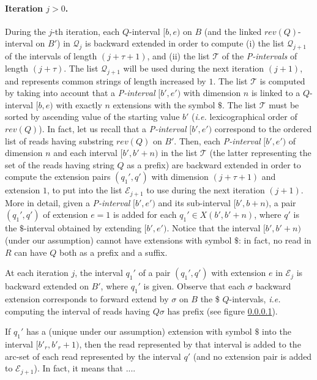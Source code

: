 \documentclass[runningheads,envcountsame,a4paper]{llncs}
\newcommand{\notaestesa}[2]{%
  {\sffamily {\bfseries #1}{\footnotesize #2}}%
  \marginpar{\framebox{\Large *}}%
}
\newcommand{\ie}{\textit{i.e.}\xspace}
\begin{document}
\paragraph{Iteration $j > 0$.}

During the $j$-th iteration, each $Q$-interval $[b, e)$ on $B$ (and the
linked $rev(Q)$-interval on $B'$) in $\mathcal{Q}_j$ is backward
extended in order to compute (i) the list $\mathcal{Q}_{j+1}$ of the
intervals of length $(j+\tau+1)$, and (ii) the list $\mathcal{T}$ of the
\emph{P-intervals} of length $(j+\tau)$.
The list $\mathcal{Q}_{j+1}$ will be used during the next iteration
$(j+1)$, and represents common strings of length increased by $1$.
The list $\mathcal{T}$ is computed by taking into account that a
\emph{P-interval} $[b', e')$ with dimension $n$ is linked to a
$Q$-interval $[b, e)$ with exactly $n$ extensions with the symbol $\$$.
The list $\mathcal{T}$ must be sorted by ascending value of the starting
value $b'$ (\ie lexicographical order of $rev(Q)$).
In fact, let us recall that a \emph{P-interval} $[b', e')$ correspond to
the ordered list of reads having substring $rev(Q)$ on $B'$.
Then, each \emph{P-interval} $[b', e')$ of dimension $n$ and each
interval $[b', b'+n)$ in the list $\mathcal{T}$ (the latter representing
the set of the reads having string $Q$ as a prefix) are backward
extended in order to compute the extension pairs $(q_{1}', q')$ with
dimension $(j+\tau+1)$ and extension $1$, to put into the list
$\mathcal{E}_{j+1}$ to use during the next iteration $(j+1)$.
More in detail, given a \emph{P-interval} $[b',e')$ and its sub-interval
$[b',b+n)$, a pair $(q_{1}',q')$ of extension $e=1$ is added for each $q_{1}'
\in X(b',b'+n)$, where $q'$ is the $\$$-interval obtained by extending
$[b',e')$.
Notice that the interval $[b', b'+n)$ (under our assumption) cannot have
extensions with symbol $\$$: in fact, no read in $R$ can have $Q$ both
as a prefix and a suffix.

At each iteration $j$, the interval $q_{1}'$ of a pair $(q_{1}', q')$ with
extension $e$ in $\mathcal{E}_j$ is backward extended on $B'$, where
$q_{1}'$ is given.
Observe that each $\sigma$  backward extension corresponds to forward
extend by $\sigma$ on $B$ the  \$ $Q$-intervals, \ie computing the
interval of reads having $Q \sigma$ has prefix (see figure \ref{}).


If $q_{1}'$ has a (unique under our assumption) extension with symbol $\$$
into the interval $[b'_r, b'_r+1)$, then the read represented by that
interval is added to the arc-set of each read represented by the
interval $q'$ (and no extension pair is added to $\mathcal{E}_{j+1}$).
\notaestesa{Paola}{qua occorre dire il perchè} In fact, it means that ....
\end{document}
